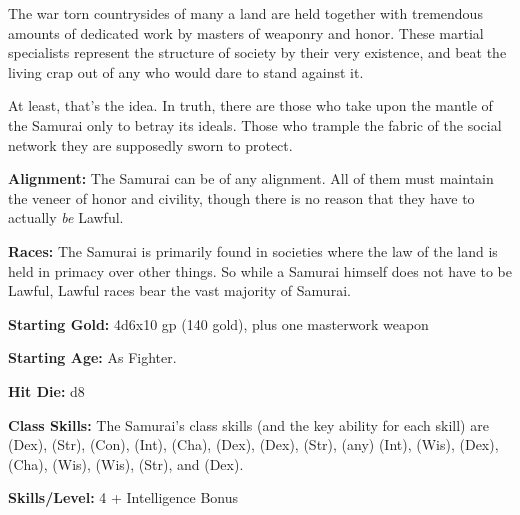 
The war torn countrysides of many a land are held together with tremendous amounts of dedicated work by masters of weaponry and honor. These martial specialists represent the structure of society by their very existence, and beat the living crap out of any who would dare to stand against it.

At least, that's the idea. In truth, there are those who take upon the mantle of the Samurai only to betray its ideals. Those who trample the fabric of the social network they are supposedly sworn to protect. 

\textbf{Alignment:} The Samurai can be of any alignment. All of them must maintain the veneer of honor and civility, though there is no reason that they have to actually \textit{be} Lawful.

\textbf{Races:} The Samurai is primarily found in societies where the law of the land is held in primacy over other things. So while a Samurai himself does not have to be Lawful, Lawful races bear the vast majority of Samurai.

\textbf{Starting Gold:} 4d6x10 gp (140 gold), plus one masterwork weapon

\textbf{Starting Age:} As Fighter.

\textbf{Hit Die:} d8

\textbf{Class Skills:} The Samurai's class skills (and the key ability for each skill) are  (Dex),  (Str),  (Con),  (Int),  (Cha),  (Dex),  (Dex),  (Str),  (any) (Int),  (Wis),  (Dex),  (Cha),  (Wis),  (Wis),  (Str), and  (Dex).

\textbf{Skills/Level:} 4 + Intelligence Bonus

\goodbab{}
\poorfor{}
\poorref{}
\goodwil{}

\begin{classtable}
\end{classtable}

